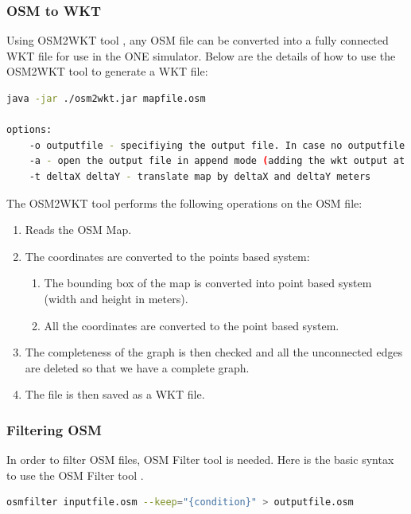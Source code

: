 \subsubsection{OSM to WKT}
Using OSM2WKT tool \cite{mayer2010osm}, any OSM file can be converted into a fully connected WKT file for use in the ONE simulator. Below are the details of how to use the OSM2WKT tool \cite{mayer2010osm} to generate a WKT file:\newline

\begin{lstlisting}[language=bash]
java -jar ./osm2wkt.jar mapfile.osm

options:
	-o outputfile - specifiying the output file. In case no outputfile is mentioned, .wkt is appended to the name of input file.
	-a - open the output file in append mode (adding the wkt output at the end of the output file)
	-t deltaX deltaY - translate map by deltaX and deltaY meters
\end{lstlisting}

\vspace{8mm}
The OSM2WKT tool \cite{mayer2010osm} performs the following operations on the OSM file:
	\begin{enumerate}
 	 \item Reads the OSM Map.
   	 \item The coordinates are converted to the points based system:
   	 	\begin{enumerate}
	   	 	\item The bounding box of the map is converted into point based system (width and height in meters).
   		 	\item All the coordinates are converted to the point based system.
   		 \end{enumerate}
   	 \item The completeness of the graph is then checked and all the unconnected edges are deleted so that we have a complete graph.
   	 \item The file is then saved as a WKT file.
	\end{enumerate}

\newpage
\subsubsection{Filtering OSM}
In order to filter OSM files, OSM Filter tool \cite{osm-filter} is needed. Here is the basic syntax to use the OSM Filter tool \cite{osm-filter}.
\vspace{2mm}
\begin{lstlisting}[language=bash]
	osmfilter inputfile.osm --keep="{condition}" > outputfile.osm
\end{lstlisting}
\vspace{5mm}

